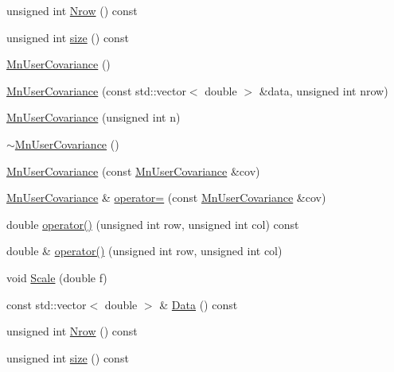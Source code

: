 \begin{DoxyCompactItemize}
\item 
unsigned int \mbox{\hyperlink{classROOT_1_1Minuit2_1_1MnUserCovariance_a10adc07ae961afea4de48183aa68f6fc}{Nrow}} () const
\item 
unsigned int \mbox{\hyperlink{classROOT_1_1Minuit2_1_1MnUserCovariance_ab15b9a83170c4e1bda1c22634fe020f5}{size}} () const
\item 
\mbox{\hyperlink{classROOT_1_1Minuit2_1_1MnUserCovariance_a40b83657c20ed7612fd58971145e2150}{Mn\+User\+Covariance}} ()
\item 
\mbox{\hyperlink{classROOT_1_1Minuit2_1_1MnUserCovariance_aeb4bbc60170bc2b4694b9064b4f6761c}{Mn\+User\+Covariance}} (const std\+::vector$<$ double $>$ \&data, unsigned int nrow)
\item 
\mbox{\hyperlink{classROOT_1_1Minuit2_1_1MnUserCovariance_a595fae416d6ebce671a3aac8320ac0e4}{Mn\+User\+Covariance}} (unsigned int n)
\item 
\mbox{\hyperlink{classROOT_1_1Minuit2_1_1MnUserCovariance_ae26c8658a5a5e7fbf16a4fe7e63740ee}{$\sim$\+Mn\+User\+Covariance}} ()
\item 
\mbox{\hyperlink{classROOT_1_1Minuit2_1_1MnUserCovariance_a5f815aae41551b49080ce32c11a5a865}{Mn\+User\+Covariance}} (const \mbox{\hyperlink{classROOT_1_1Minuit2_1_1MnUserCovariance}{Mn\+User\+Covariance}} \&cov)
\item 
\mbox{\hyperlink{classROOT_1_1Minuit2_1_1MnUserCovariance}{Mn\+User\+Covariance}} \& \mbox{\hyperlink{classROOT_1_1Minuit2_1_1MnUserCovariance_a404884fb8452152d56ff18f83e277960}{operator=}} (const \mbox{\hyperlink{classROOT_1_1Minuit2_1_1MnUserCovariance}{Mn\+User\+Covariance}} \&cov)
\item 
double \mbox{\hyperlink{classROOT_1_1Minuit2_1_1MnUserCovariance_abc3ebb8eb0d31cb2cdf38fb16a4d8224}{operator()}} (unsigned int row, unsigned int col) const
\item 
double \& \mbox{\hyperlink{classROOT_1_1Minuit2_1_1MnUserCovariance_af63a82e8fc0c72cdb46fe670da78ffce}{operator()}} (unsigned int row, unsigned int col)
\item 
void \mbox{\hyperlink{classROOT_1_1Minuit2_1_1MnUserCovariance_ab94f947af8cd0dbff661baa69b429ae3}{Scale}} (double f)
\item 
const std\+::vector$<$ double $>$ \& \mbox{\hyperlink{classROOT_1_1Minuit2_1_1MnUserCovariance_a796819e63a5a1a80373a7be0cd764f2e}{Data}} () const
\item 
unsigned int \mbox{\hyperlink{classROOT_1_1Minuit2_1_1MnUserCovariance_a10adc07ae961afea4de48183aa68f6fc}{Nrow}} () const
\item 
unsigned int \mbox{\hyperlink{classROOT_1_1Minuit2_1_1MnUserCovariance_ab15b9a83170c4e1bda1c22634fe020f5}{size}} () const
\end{DoxyCompactItemize}


